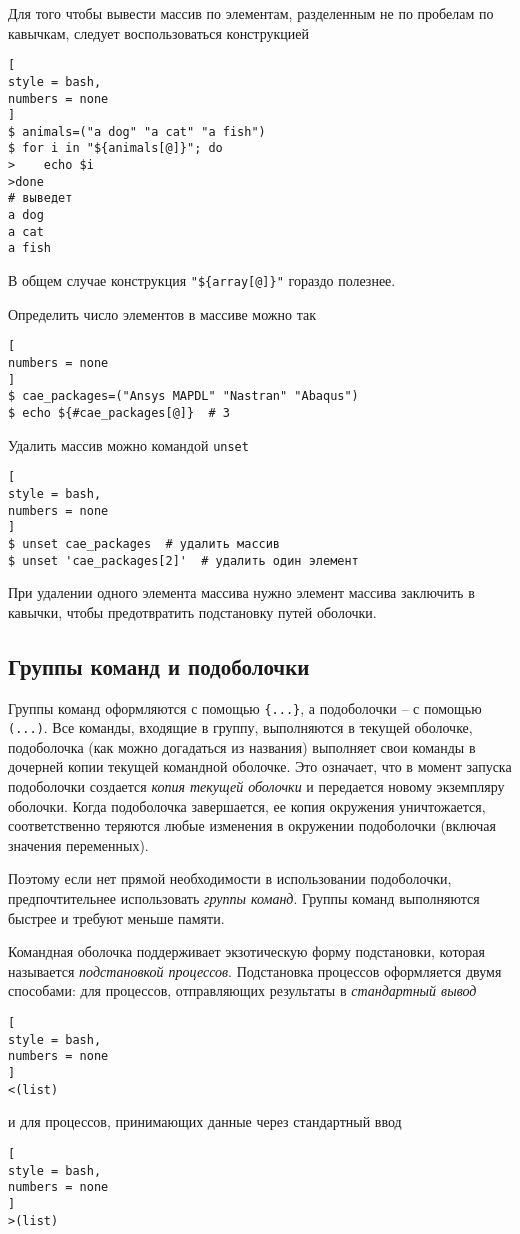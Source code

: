 \documentclass[%
	11pt,
	a4paper,
	utf8,
		]{article}
\begin{document}
Для того чтобы вывести массив по элементам, разделенным не по пробелам по кавычкам, следует воспользоваться конструкцией
\begin{lstlisting}[
style = bash,
numbers = none
]
$ animals=("a dog" "a cat" "a fish")
$ for i in "${animals[@]}"; do
>    echo $i
>done
# выведет
a dog
a cat
a fish
\end{lstlisting}

В общем случае конструкция \verb|"${array[@]}"| гораздо полезнее.

Определить число элементов в массиве можно так
\begin{lstlisting}[
numbers = none
]
$ cae_packages=("Ansys MAPDL" "Nastran" "Abaqus")
$ echo ${#cae_packages[@]}  # 3
\end{lstlisting}

Удалить массив можно командой \texttt{unset}
\begin{lstlisting}[
style = bash,
numbers = none
]
$ unset cae_packages  # удалить массив
$ unset 'cae_packages[2]'  # удалить один элемент
\end{lstlisting}

При удалении одного элемента массива нужно элемент массива заключить в кавычки, чтобы предотвратить подстановку путей оболочки.

\subsection{Группы команд и подоболочки}

Группы команд оформляются с помощью \verb|{...}|, а подоболочки -- с помощью \verb|(...)|. Все команды, входящие в группу, выполняются в текущей оболочке, подоболочка (как можно догадаться из названия) выполняет свои команды в дочерней копии текущей командной оболочке. Это означает, что в момент запуска подоболочки создается \emph{копия текущей оболочки} и передается новому экземпляру оболочки. Когда подоболочка завершается, ее копия окружения уничтожается, соответственно теряются любые изменения в окружении подоболочки (включая значения переменных).

Поэтому если нет прямой необходимости в использовании подоболочки, предпочтительнее использовать \emph{группы команд}. Группы команд выполняются быстрее и требуют меньше памяти.


Командная оболочка поддерживает экзотическую форму подстановки, которая называется \emph{подстановкой процессов}. Подстановка процессов оформляется двумя способами: для процессов, отправляющих результаты в \emph{стандартный вывод}
\begin{lstlisting}[
style = bash,
numbers = none
]
<(list)
\end{lstlisting}
и для процессов, принимающих данные через стандартный ввод
\begin{lstlisting}[
style = bash,
numbers = none
]
>(list)
\end{lstlisting}
\end{document}

